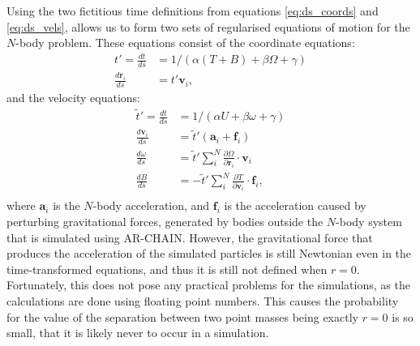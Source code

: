\documentclass[english, twoside]{HYgradu}
\begin{document}
Using the two fictitious time definitions from equations \ref{eq:ds_coords} and \ref{eq:ds_vels}, allows us to form two sets of regularised equations of motion for the $N$-body problem. These equations consist of the coordinate equations:
\begin{equation}
\begin{split}
t' = \frac{dt}{ds} &= 1/(\alpha(T+B) + \beta\Omega + \gamma) \\
\frac{d\mathbf{r}_i}{ds} &= t' \mathbf{v}_i,
\end{split}
\end{equation}
and the velocity equations:
\begin{equation}
\begin{split}
\tilde{t}' = \frac{dt}{ds} &= 1/(\alpha U + \beta\omega + \gamma) \\
\frac{d\mathbf{v}_i}{ds} &= \tilde{t}' (\mathbf{a}_i + \mathbf{f}_i) \\
\frac{d\omega}{ds} &= \tilde{t}' \displaystyle\sum^N_i \frac{\partial \Omega}{\partial \mathbf{r}_i} \cdot \mathbf{v}_i \\
\frac{dB}{ds} &= -\tilde{t}' \displaystyle\sum^N_i \frac{\partial T}{\partial \mathbf{v}_i} \cdot \mathbf{f}_i, \\
\end{split}
\end{equation}
where $\mathbf{a}_i$ is the $N$-body acceleration, and $\mathbf{f}_i$ is the acceleration caused by perturbing gravitational forces, generated by bodies outside the $N$-body system that is simulated using AR-CHAIN. However, the gravitational force that produces the acceleration of the simulated particles is still Newtonian even in the time-transformed equations, and thus it is still not defined when $r=0$. Fortunately, this does not pose any practical problems for the simulations, as the calculations are done using floating point numbers. This causes the probability for the value of the separation between two point masses being exactly $r=0$ is so small, that it is likely never to occur in a simulation.
\end{document}
